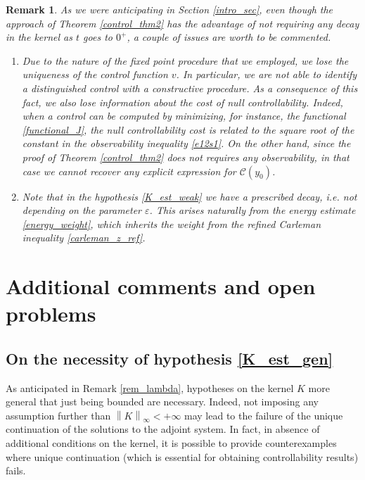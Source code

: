 \documentclass[preprint,1p]{elsarticle}
\newcommand{\norm}[2]{\left\|#1\right\|_{#2}}
\newtheorem{remark}{\bf Remark}[section]
\begin{document}
%
\begin{remark}
As we were anticipating in Section \ref{intro_sec}, even though the approach of Theorem \ref{control_thm2} has the advantage of not requiring any decay in the kernel as $t$ goes to $0^+$, a couple of issues are worth to be commented. 
\begin{enumerate}
	\item Due to the nature of the fixed point procedure that we employed, we lose the uniqueness of the control function $v$. In particular, we are not able to identify a distinguished control with a constructive procedure. As a consequence of this fact, we also lose information about the cost of null controllability. Indeed, when a control can be computed by minimizing, for instance, the functional \eqref{functional_J}, the null controllability cost is related to the square root of the constant in the observability inequality \eqref{e12s1}. On the other hand, since the proof of Theorem \ref{control_thm2} does not requires any observability, in that case we cannot recover any explicit expression for $\mathcal C(y_0)$.
	
	\item Note that in the hypothesis \eqref{K_est_weak} we have a prescribed decay, i.e. not depending on the parameter $\varepsilon$. This arises naturally from the energy estimate \eqref{energy_weight}, which inherits the weight from the refined Carleman inequality \eqref{carleman_z_ref}.
\end{enumerate}
\end{remark}	

\section{Additional comments and open problems}\label{comments_sec}

\subsection{On the necessity of hypothesis \eqref{K_est_gen}}

As anticipated in Remark \ref{rem_lambda}, hypotheses on the kernel $K$ more general that just being bounded are necessary. Indeed, not imposing any assumption further than $\norm{K}{\infty}<+\infty$ may lead to the failure of the unique continuation of the solutions to the adjoint system. In fact, in absence of additional conditions on the kernel, it is possible to provide counterexamples where unique continuation (which is essential for obtaining controllability results) fails.
\end{document}
